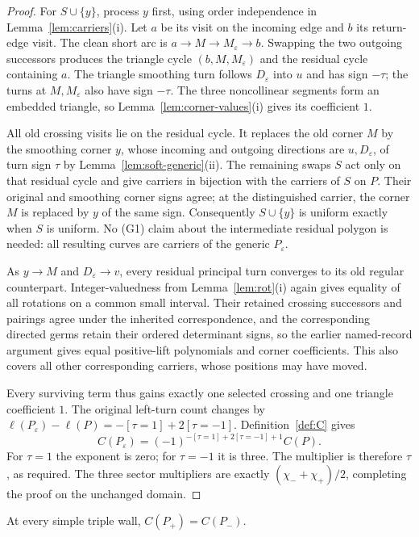 \begin{proof}
For $S\cup\{y\}$, process $y$ first, using order independence
in Lemma~\ref{lem:carriers}(i). Let $a$ be its visit on the incoming
edge and $b$ its return-edge visit. The clean short arc is
$a\to M\to M_\varepsilon\to b$. Swapping the two outgoing
successors produces the triangle cycle $(b,M,M_\varepsilon)$
and the residual cycle containing $a$. The triangle smoothing
turn follows $D_\varepsilon$ into $u$ and has sign $-\tau$;
the turns at $M,M_\varepsilon$ also have sign $-\tau$.
The three noncollinear segments form an embedded triangle,
so Lemma~\ref{lem:corner-values}(i) gives its coefficient $1$.

All old crossing visits lie on the residual cycle. It replaces
the old corner $M$ by the smoothing corner $y$, whose incoming
and outgoing directions are $u,D_\varepsilon$, of turn sign
$\tau$ by Lemma~\ref{lem:soft-generic}(ii).
The remaining swaps $S$ act only on that residual cycle and give
carriers in bijection with the carriers of $S$ on $P$.
Their original and smoothing corner signs agree; at the distinguished
carrier, the corner $M$ is replaced by $y$ of the same sign.
Consequently $S\cup\{y\}$ is uniform exactly when $S$ is uniform.
No (G1) claim about the intermediate residual polygon is needed:
all resulting curves are carriers of the generic $P_\varepsilon$.

As $y\to M$ and $D_\varepsilon\to v$, every residual principal
turn converges to its old regular counterpart. Integer-valuedness
from Lemma~\ref{lem:rot}(i) again gives equality of all rotations
on a common small interval. Their retained crossing successors and pairings agree under the
inherited correspondence, and the corresponding directed germs
retain their ordered determinant signs,
so the earlier named-record argument gives equal positive-lift
polynomials and corner coefficients. This also covers all other
corresponding carriers, whose positions may have moved.

Every surviving term thus gains exactly one selected crossing and
one triangle coefficient $1$. The original left-turn count changes by
$\ell(P_\varepsilon)-\ell(P)=-[\tau=1]+2[\tau=-1]$.
Definition~\ref{def:C} gives
\[
C(P_\varepsilon)
=(-1)^{-[\tau=1]+2[\tau=-1]+1}C(P).
\]
For $\tau=1$ the exponent is zero; for $\tau=-1$ it is three.
The multiplier is therefore $\tau$, as required. The three sector
multipliers are exactly $(\chi_-+\chi_+)/2$, completing the proof
on the unchanged domain.
\end{proof}

\begin{hypothesis}[R]\label{hyp:R}\leanok
At every simple triple wall, $C(P_+)=C(P_-)$. 
\end{hypothesis}

